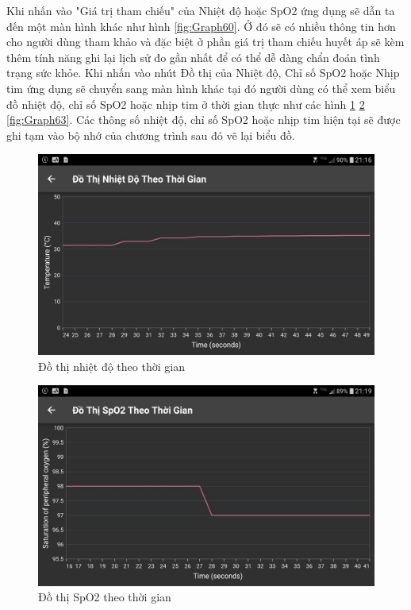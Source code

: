 \documentclass{report}
\begin{document}
Khi nhấn vào "Giá trị tham chiếu" của Nhiệt độ hoặc SpO2 ứng dụng sẽ dẫn ta đến một màn hình khác như hình \ref{fig:Graph60}. Ở đó sẽ có nhiều thông tin hơn cho người dùng tham khảo và đặc biệt ở phần giá trị tham chiếu huyết áp sẽ kèm thêm tính năng ghi lại lịch sử đo gần nhất để có thể dễ dàng chẩn đoán tình trạng sức khỏe.
\newpage
Khi nhấn vào nhút Đồ thị của Nhiệt độ, Chỉ số SpO2 hoặc Nhịp tim ứng dụng sẽ chuyển sang màn hình khác tại đó người dùng có thể xem biểu đồ nhiệt độ, chỉ số SpO2 hoặc nhịp tim ở thời gian thực như các hình \ref{fig:Graph61} \ref{fig:Graph62} \ref{fig:Graph63}. Các thông số nhiệt độ, chỉ số SpO2 hoặc nhịp tim hiện tại sẽ được ghi tạm vào bộ nhớ của chương trình sau đó vẽ lại biểu đồ. 
\begin{figure}[h]
	\centering
	\includegraphics[scale = 0.17]{fig61.png}
	\caption{Đồ thị nhiệt độ theo thời gian}
	\label{fig:Graph61}
\end{figure}
\begin{figure}[h]
	\centering
	\includegraphics[scale = 0.17]{fig62.png}
	\caption{Đồ thị SpO2 theo thời gian}
	\label{fig:Graph62}
\end{figure}
\end{document}
